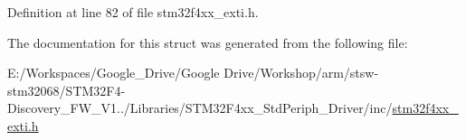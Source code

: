 Definition at line 82 of file stm32f4xx\-\_\-exti.\-h.



The documentation for this struct was generated from the following file\-:\begin{DoxyCompactItemize}
\item 
E\-:/\-Workspaces/\-Google\-\_\-\-Drive/\-Google Drive/\-Workshop/arm/stsw-\/stm32068/\-S\-T\-M32\-F4-\/\-Discovery\-\_\-\-F\-W\-\_\-\-V1../\-Libraries/\-S\-T\-M32\-F4xx\-\_\-\-Std\-Periph\-\_\-\-Driver/inc/\hyperlink{stm32f4xx__exti_8h}{stm32f4xx\-\_\-exti.\-h}\end{DoxyCompactItemize}

